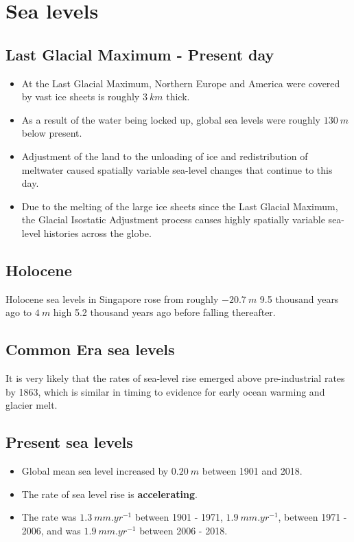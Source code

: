 \documentclass[11pt]{article}
\begin{document}
\newpage
\section{Sea levels}
\label{sec:orgd087f24}

\subsection{Last Glacial Maximum - Present day}
\label{sec:orga4eef86}
\begin{itemize}
\item At the Last Glacial Maximum, Northern Europe and America were covered by vast ice sheets is roughly \(\qty{3}{km}\) thick.
\item As a result of the water being locked up, global sea levels were roughly \(\qty{130}{m}\) below present.
\item Adjustment of the land to the unloading of ice and redistribution of meltwater caused spatially variable sea-level changes that continue to this day.
\item Due to the melting of the large ice sheets since the Last Glacial Maximum, the Glacial Isostatic Adjustment process causes highly spatially variable sea-level histories across the globe.
\end{itemize}
\subsection{Holocene}
\label{sec:orgec9315f}
Holocene sea levels in Singapore rose from roughly \(\qty{-20.7}{m}\) 9.5 thousand years ago to \(\qty{4}{m}\) high 5.2 thousand years ago before falling thereafter.
\subsection{Common Era sea levels}
\label{sec:org000d948}
It is very likely that the rates of sea-level rise emerged above pre-industrial rates by 1863, which is similar in timing to evidence for early ocean warming and glacier melt.
\subsection{Present sea levels}
\label{sec:orgfb1561e}
\begin{itemize}
\item Global mean sea level increased by \(\qty{0.20}{m}\) between 1901 and 2018.
\item The rate of sea level rise is \textbf{accelerating}.
\item The rate was \(\qty{1.3}{mm.yr^{-1}}\) between 1901 - 1971, \(\qty{1.9}{mm.yr^{-1}}\), between 1971 - 2006, and was \(\qty{1.9}{mm.yr^{-1}}\) between 2006 - 2018.
\end{itemize}
\end{document}
